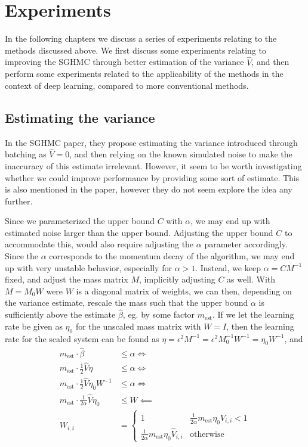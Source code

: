 \chapter{Experiments}

In the following chapters we discuss a series of experiments relating to the methods discussed above. 
We first discuss some experiments relating to improving the SGHMC through better estimation of the variance $\hat{V}$, and then perform some experiments related to the applicability of the methods in the context of deep learning, compared to more conventional methods.

\section{Estimating the variance}

In the SGHMC paper, they propose estimating the variance introduced through batching as $\hat{V}=0$, and then relying on the known simulated noise to make the inaccuracy of this estimate irrelevant. 
However, it seem to be worth investigating whether we could improve performance by providing some sort of estimate. 
This is also mentioned in the paper, however they do not seem explore the idea any further. 

Since we parameterized the upper bound $C$ with $\alpha$, we may end up with estimated noise larger than the upper bound.
Adjusting the upper bound $C$ to accommodate this, would also require adjusting the $\alpha$ parameter accordingly.
Since the $\alpha$ corresponds to the momentum decay of the algorithm, we may end up with very unstable behavior, especially for $\alpha > 1$. 
Instead, we keep $\alpha=CM^{-1}$ fixed, and adjust the mass matrix $M$, implicitly adjusting $C$ as well.
With $M = M_0 W$ were $W$ is a diagonal matrix of weights, we can then, depending on the variance estimate, rescale the mass such that the upper bound $\alpha$ is sufficiently above the estimate $\hat\beta$, eg. by some factor $m_{\text{est}}$.
If we let the learning rate be given as $\eta_0$  for the unscaled mass matrix with $W = I$, then the learning rate for the scaled system can be found as $\eta = \epsilon^2 M^{-1} = \epsilon^2 M_0^{-1}W^{-1} = \eta_0 W^{-1}$, and
\begin{align*}
    m_{\text{est}} \cdot \hat{\beta}  &\leq \alpha \Leftrightarrow\\ 
    m_{\text{est}} \cdot \frac{1}{2} \hat V \eta   &\leq \alpha \Leftrightarrow\\ 
    m_{\text{est}} \cdot \frac{1}{2} \hat V \eta_0 W^{-1}  &\leq \alpha \Leftrightarrow\\ 
    m_{\text{est}} \cdot \frac{1}{2\alpha} \hat V \eta_0   &\leq W \impliedby \\
    W_{i,i} &= \begin{cases}
        1 & \frac{1}{2\alpha}m_{\text{est}} \eta_0 \hat{V}_{i,i} < 1 \\
        \frac{1}{2\alpha}m_{\text{est}} \eta_0 \hat{V}_{i,i} & \text{otherwise}
    \end{cases}
\end{align*}

